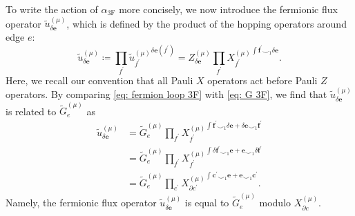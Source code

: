\documentclass[aps,twocolumn,prx,floatfix,preprintnumbers, nofootinbib,10pt]{revtex4-2}
\numberwithin{equation}{section}
\theoremstyle{definition}
\theoremstyle{remark}
\theoremstyle{claim}
\begin{document}
To write the action of $\alpha_\text{3F}$ more concisely, we now introduce the fermionic flux operator $\tilde{u}_{\delta \bm{e}}^{(\mu)}$, which is defined by the product of the hopping operators around edge $e$:
\begin{equation}
\tilde{u}_{\delta \bm{e}}^{(\mu)} \coloneq \prod_{f^{\prime}} \left. \tilde{u}_{f^{\prime}}^{(\mu)} \right.^{\delta \bm{e}(f^{\prime})} = Z_{\delta \bm{e}}^{(\mu)} \prod_{f^{\prime}} \left. X_{f^{\prime}}^{(\mu)} \right.^{\int \bm{f}^{\prime} \smile_1 \delta \bm{e}}.
\label{eq: fermion loop 3F}
\end{equation}
Here, we recall our convention that all Pauli $X$ operators act before Pauli $Z$ operators.
By comparing \eqref{eq: fermion loop 3F} with \eqref{eq: G 3F}, we find that $\tilde{u}_{\delta \bm{e}}^{(\mu)}$ is related to $\widetilde{G}_e^{(\mu)}$ as
\begin{equation}
\begin{aligned}
\tilde{u}_{\delta \bm{e}}^{(\mu)} &= \widetilde{G}_e^{(\mu)} \prod_{f^{\prime}} \left. X_{f^{\prime}}^{(\mu)} \right.^{\int \bm{f}^{\prime} \smile_1 \delta \bm{e} + \delta \bm{e} \smile_1 \bm{f}^{\prime}} \\
&= \widetilde{G}_e^{(\mu)} \prod_{f^{\prime}} \left. X_{f^{\prime}}^{(\mu)} \right.^{\int \delta \bm{f}^{\prime} \smile_1 \bm{e} + \bm{e} \smile_1 \delta \bm{f}^{\prime}} \\
&= \widetilde{G}_e^{(\mu)} \prod_{c^{\prime}} \left. X_{\partial c^{\prime}}^{(\mu)} \right.^{\int \bm{c}^{\prime} \smile_1 \bm{e} + \bm{e} \smile_1 \bm{c}^{\prime}}.
\end{aligned}
\label{eq: uG}
\end{equation}
Namely, the fermionic flux operator $\tilde{u}_{\delta \bm{e}}^{(\mu)}$ is equal to $\widetilde{G}_e^{(\mu)}$ modulo $X_{\partial c}^{(\mu)}$.
\end{document}

